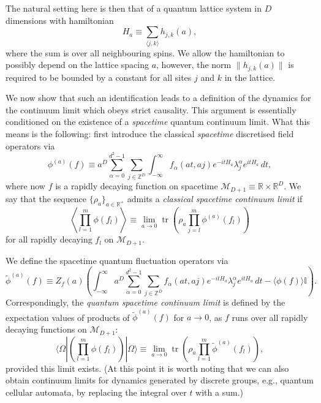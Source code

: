 \documentclass[prl,twocolumn,lengthcheck,superscriptaddress]{revtex4-1}
\newcommand{\tr}{\operatorname{tr}}
\theoremstyle{definition}
\theoremstyle{remark}
\begin{document}
The natural setting here is then that of a quantum lattice system in $D$ dimensions with hamiltonian 
\begin{equation}
	H_a \equiv \sum_{\langle j,k\rangle } h_{j,k}(a),
\end{equation}
where the sum is over all neighbouring spins. We allow the hamiltonian to possibly depend on the lattice spacing $a$, however, the norm $\|h_{j,k}(a)\|$ is required to be bounded by a constant for all sites $j$ and $k$ in the lattice. 

We now show that such an identification leads to a definition of the dynamics for the continuum limit which obeys strict causality. This argument is essentially conditioned on the existence of a \emph{spacetime} quantum continuum limit. What this means is the following: first introduce the classical \emph{spacetime} discretised field operators via
\begin{equation}
	\phi^{(a)}(f) \equiv a^D\sum_{\alpha = 0}^{d^2-1}\sum_{j\in\mathbb{Z}^D} \int_{-\infty}^\infty f_\alpha(at, aj) e^{-itH_a}\lambda^\alpha_je^{itH_a} \, dt,
\end{equation}
where now $f$ is a rapidly decaying function on spacetime $\mathcal{M}_{D+1}\equiv\mathbb{R}\times \mathbb{R}^D$. We say that the sequence 
$\{\rho_a\}_{a\in\mathbb{R}^+}$ admits a \emph{classical spacetime continuum limit} if 
\begin{equation}
	\left\langle\prod_{l=1}^m\phi(f_l)\right\rangle \equiv \lim_{a\rightarrow 0} \tr\left(\rho_a \prod_{j=l}^m\phi^{(a)}(f_l)\right)
\end{equation}
for all rapidly decaying $f_l$ on $\mathcal{M}_{D+1}$.

We define the spacetime quantum fluctuation operators via
\begin{equation}
	\widetilde{\phi}^{(a)}(f) \equiv Z_f(a)\left( \int_{-\infty}^\infty  a^D\sum_{\alpha = 0}^{d^2-1}\sum_{j\in \mathbb{Z}^D} f_\alpha(at, aj) e^{-itH_a}\lambda^\alpha_je^{itH_a} \,dt - \langle\phi(f)\rangle\mathbb{I}\right).
\end{equation}
Correspondingly, the \emph{quantum spacetime continuum limit} is defined by the expectation values of products of $\widetilde{\phi}^{(a)}(f)$ for $a\rightarrow 0$, as $f$ runs over all rapidly decaying functions on $\mathcal{M}_{D+1}$:
\begin{equation}\label{eq:qsctslimit}
	\langle\Omega|\left(\prod_{l=1}^m\widehat{\phi}(f_l)\right)|\Omega\rangle \equiv \lim_{a\rightarrow 0} \tr\left(\rho_a \prod_{l=1}^m\widetilde{\phi}^{(a)}(f_l)\right),
\end{equation}
provided this limit exists.
(At this point it is worth noting that we can also obtain continuum limits for dynamics generated by discrete groups, e.g., quantum cellular automata, by replacing the integral over $t$ with a sum.)
\end{document}
